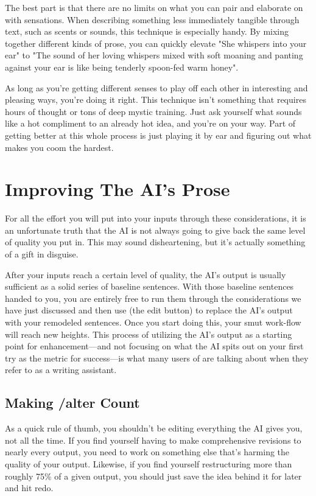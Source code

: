 ﻿\documentclass[Coomer-main.tex]{subfiles}
\begin{document}
The best part is that there are no limits on what you can pair and elaborate on with sensations.
When describing something less immediately tangible through text, such as scents or sounds, this technique is especially handy.
By mixing together different kinds of prose, you can quickly elevate "She whispers into your ear" to "The sound of her loving whispers mixed with soft moaning and panting against your ear is like being tenderly spoon-fed warm honey".

As long as you're getting different senses to play off each other in interesting and pleasing ways, you're doing it right.
This technique isn't something that requires hours of thought or tons of deep mystic training.
Just ask yourself what sounds like a hot compliment to an already hot idea, and you're on your way.
Part of getting better at this whole process is just playing it by ear and figuring out what makes you coom the hardest.

\section{Improving The AI's Prose}

For all the effort you will put into your inputs through these considerations, it is an unfortunate truth that the AI is not always going to give back the same level of quality you put in.
This may sound disheartening, but it's actually something of a gift in disguise.


After your inputs reach a certain level of quality, the AI's output is usually sufficient as a solid series of baseline sentences.
With those baseline sentences handed to you, you are entirely free to run them through the considerations we have just discussed and then use \alt (the edit button) to replace the AI’s output with your remodeled sentences.
Once you start doing this, your smut work-flow will reach new heights.
This process of utilizing the AI's output as a starting point for enhancement—and not focusing on what the AI spits out on your first try as the metric for success—is what many users of \aid are talking about when they refer to \aid as a writing assistant.

\subsection{Making /alter Count}

As a quick rule of thumb, you shouldn't be editing everything the AI gives you, not all the time.
If you find yourself having to make comprehensive revisions to nearly every output, you need to work on something else that's harming the quality of your output.
Likewise, if you find yourself restructuring more than roughly 75\% of a given output, you should just save the idea behind it for later and hit redo.
\end{document}
